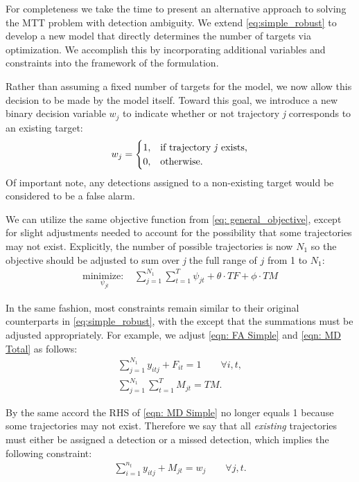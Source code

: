 For completeness we take the time to present an alternative approach to solving the MTT problem with detection ambiguity. We extend \eqref{eq:simple_robust} to develop a new model that directly determines the number of targets via optimization. We accomplish this by incorporating additional variables and constraints into the framework of the formulation. 

Rather than assuming a fixed number of targets for the model, we now allow this decision to be made by the model itself. Toward this goal, we introduce a new binary decision variable $w_{j}$ to indicate whether or not trajectory \textit{j} corresponds to an existing target:
\[w_{j} = 
\begin{cases}
1, & \text{if trajectory \textit{j} exists,}\\
0, & \text{otherwise.}
\end{cases}\]
Of important note, any detections assigned to a non-existing target would be considered to be a false alarm. 

We can utilize the same objective function from \eqref{eq: general_objective}, except for slight adjustments needed to account for the possibility that some trajectories may not exist. Explicitly, the number of possible trajectories is now $N_{1}$ so the objective should be adjusted to sum over \textit{j} the full range of $j$ from 1 to $N_{1}$:
\begin{align*}
\underset{\psi_{jt}}{\text{minimize: }} & \sum_{j=1}^{N_{1}} \sum_{t=1}^{T} \psi_{jt} + \theta \cdot TF + \phi \cdot TM
\end{align*}

In the same fashion, most constraints remain similar to their original counterparts in \eqref{eq:simple_robust}, with the except that the summations must be adjusted appropriately. For example, we adjust \eqref{eqn: FA Simple} and \eqref{eqn: MD Total} as follows: 
\begin{align*}
\sum_{j=1}^{N_{1}} y_{itj} + F_{it} = 1 \qquad \forall i,t,\\
\sum_{j=1}^{N_{1}} \sum_{t=1}^{T} M_{jt} = TM.
\end{align*}

By the same accord the RHS of \eqref{eqn: MD Simple} no longer equals 1 because some trajectories may not exist. Therefore we say that all \textit{existing} trajectories must either be assigned a detection or a missed detection, which implies the following constraint:
\begin{align}\label{eqn: Existing Targets}
\sum_{i=1}^{n_{t}} y_{itj} + M_{jt} = w_{j} \qquad \forall j,t.
\end{align}

